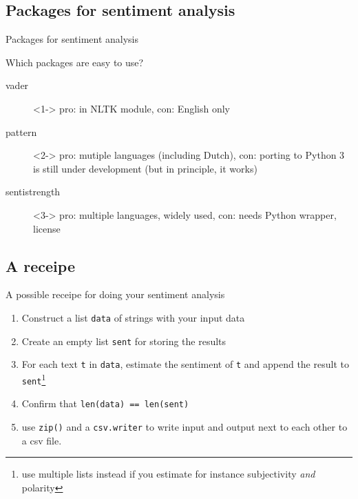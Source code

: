 \documentclass{beamer}
\begin{document}
\subsection{Packages for sentiment analysis}

\begin{frame}[plain]
Packages for sentiment analysis
\end{frame}


\begin{frame}{Which packages are easy to use?}
	
\begin{description}
	\item[vader]<1-> pro: in NLTK module, con: English only
	\item[pattern]<2-> pro: mutiple languages (including Dutch), con: porting to Python 3 is still under development (but in principle, it works)
	\item[sentistrength]<3-> pro: multiple languages, widely used, con: needs Python wrapper, license
	
\end{description}




\end{frame}



\subsection{A receipe}

\begin{frame}{A possible receipe for doing your sentiment analysis}
	
\begin{enumerate}
	\item Construct a list \texttt{data} of strings with your input data
	\item Create an empty list \texttt{sent} for storing the results
	\item For each text \texttt{t} in \texttt{data}, estimate the sentiment of \texttt{t} and append the result to \texttt{sent}\footnote{use multiple lists instead if you estimate for instance subjectivity \emph{and} polarity}
	\item Confirm that \texttt{len(data) == len(sent)}
	\item use \texttt{zip()} and a  \texttt{csv.writer} to write input and output next to each other to a csv file.
\end{enumerate}

\end{frame}
\end{document}
